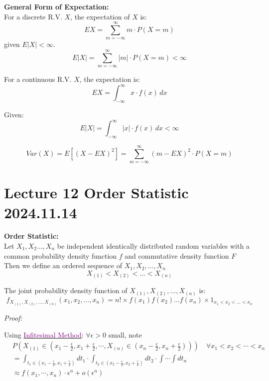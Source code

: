 \documentclass{article}
\begin{document}
\begin{definition}
    \textbf{General Form of Expectation:}\\
    For a discrete R.V. $X$, the expectation of $X$ is:
    \[ EX = \sum_{m=-\infty}^{\infty} m\cdot P(X=m) \]
    given $E|X| < \infty$.
    \[ E|X| = \sum_{m=-\infty}^{\infty} |m|\cdot P(X=m) <\infty \]
    
    For a continuous R.V. $X$, the expectation is:
    \[ EX = \int_{-\infty}^{\infty} x \cdot f(x) \, dx \]
    
    Given:
    \[ E|X| = \int_{-\infty}^{\infty} |x| \cdot f(x) \, dx < \infty \]
    
\end{definition}
\[ Var(X) = E[(X-EX)^{2}] = \sum_{m=-\infty}^{\infty} (m-EX)^{2} \cdot P(X=m) \]








\section{Lecture 12 Order Statistic 2024.11.14}
\begin{definition}
    \textbf{Order Statistic:}\\
    Let $X_1, X_2\dots, X_n$ be independent identically distributed random variables with a common probability density function $f$ and commutative density function $F$\\
    Then we define an ordered sequence of $X_1,X_2,\dots, X_n$
    \begin{equation*}
        X_{(1)} < X_{(2)} < \dots < X_{(n)}
    \end{equation*}
\end{definition}
\begin{theorem}
    The joint probability density function of $X_{(1)}, X_{(2)}, \dots, X_{(n)}$ is:
    \begin{equation*}
        f_{X_{(1)},X_{(2)},\dots,X_{(n)}}(x_1,x_2,\dots,x_n) = n! \times f(x_1)f(x_2)\dots f(x_n) \times 1_{x_1 < x_2 < \dots < x_n}
    \end{equation*}
\end{theorem}
\emph{Proof:}

Using \underline{\textcolor{purple}{Infitesimal Method}}:
$ \forall \epsilon >0 $ 
small, note 
\begin{align*}
    & P(X_{(1)} \in (x_{1} - \frac{\epsilon}{2}, x_{1} + \frac{\epsilon}{2}, \cdots , X_{(n)} \in (x_{n} - \frac{\epsilon}{2}, x_{n} + \frac{\epsilon}{2}))) \quad \forall x_{1} < x_{2} < \cdots < x_{n}\\
    &= \int_{t_{1} \in (x_{1} - \frac{\epsilon}{2}, x_{1} + \frac{\epsilon}{2})} d t_{1} \cdot \int_{t_{2} \in (x_{2} - \frac{\epsilon}{2}, x_{2} + \frac{\epsilon}{2})} dt_{2} \cdot \int \cdots \int dt_{n}\\
    &\approx f(x_{1},\cdots,x_{n}) \cdot \epsilon^{n} + o(\epsilon^{n}) 
\end{align*}
\end{document}

